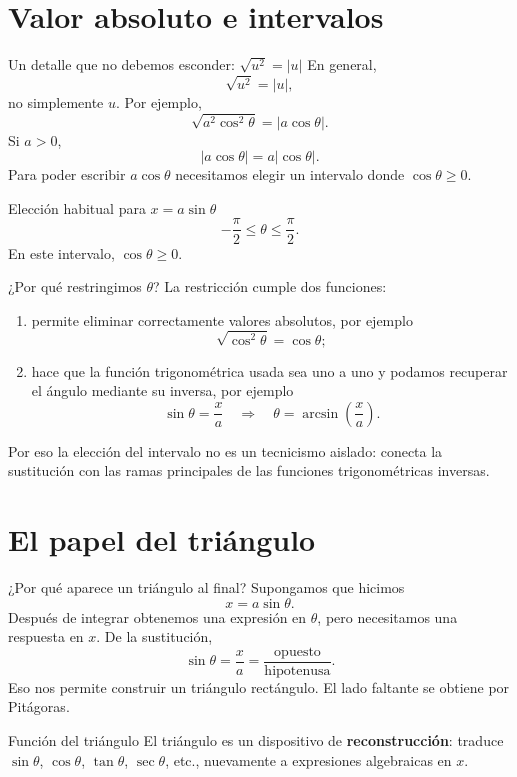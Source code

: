 \documentclass[10pt,aspectratio=169]{beamer}
\begin{document}
\section{Valor absoluto e intervalos}
\begin{frame}{Un detalle que no debemos esconder: $\sqrt{u^2}=|u|$}
En general,
\[
\boxed{\sqrt{u^2}=|u|},
\]
no simplemente $u$.
Por ejemplo,
\[
\sqrt{a^2\cos^2\theta}=|a\cos\theta|.
\]
Si $a>0$,
\[
|a\cos\theta|=a|\cos\theta|.
\]
Para poder escribir $a\cos\theta$ necesitamos elegir un intervalo donde $\cos\theta\ge0$.
\begin{block}{Elección habitual para $x=a\sin\theta$}
\[
-\frac{\pi}{2}\le\theta\le\frac{\pi}{2}.
\]
En este intervalo, $\cos\theta\ge0$.
\end{block}
\end{frame}

\begin{frame}{¿Por qué restringimos $\theta$?}
La restricción cumple dos funciones:
\begin{enumerate}
\item permite eliminar correctamente valores absolutos, por ejemplo
\[
\sqrt{\cos^2\theta}=\cos\theta;
\]
\item hace que la función trigonométrica usada sea uno a uno y podamos recuperar el ángulo mediante su inversa, por ejemplo
\[
\sin\theta=\frac{x}{a}
\quad\Longrightarrow\quad
\theta=\arcsin\left(\frac{x}{a}\right).
\]
\end{enumerate}
Por eso la elección del intervalo no es un tecnicismo aislado: conecta la sustitución con las ramas principales de las funciones trigonométricas inversas.
\end{frame}

\section{El papel del triángulo}
\begin{frame}{¿Por qué aparece un triángulo al final?}
Supongamos que hicimos
\[
x=a\sin\theta.
\]
Después de integrar obtenemos una expresión en $\theta$, pero necesitamos una respuesta en $x$.
De la sustitución,
\[
\sin\theta=\frac{x}{a}
=\frac{\text{opuesto}}{\text{hipotenusa}}.
\]
Eso nos permite construir un triángulo rectángulo. El lado faltante se obtiene por Pitágoras.
\begin{block}{Función del triángulo}
El triángulo es un dispositivo de \textbf{reconstrucción}: traduce $\sin\theta$, $\cos\theta$, $\tan\theta$, $\sec\theta$, etc., nuevamente a expresiones algebraicas en $x$.
\end{block}
\end{frame}
\end{document}
